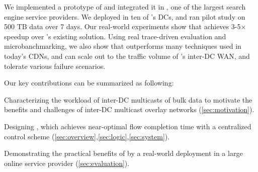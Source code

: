 We implemented a prototype of \name and integrated it in
\company,
one of the largest search engine service
providers. We deployed \name in ten of \company's DCs, and
ran pilot study on 500 TB data over 7 days. Our
real-world experiments show that \name achieves 3-5$\times$
speedup over \company's existing solution.
Using real trace-driven evaluation and microbanchmarking,
we also show that \name outperforms many techniques used in
today's CDNs, and \name can scale out to the traffic volume
of \company's inter-DC WAN, and tolerate various failure
scenarios.


Our key contributions can be summarized as following:
\begin{packeditemize}
\item Characterizing the workload of inter-DC multicasts of bulk data
to motivate the benefits and challenges of inter-DC multicast overlay
networks (\Section\ref{sec:motivation}).
\item Designing \name, which achieves near-optimal flow completion
time with a centralized control scheme (\Section\ref{sec:overview},\ref{sec:logic},\ref{sec:system}).
\item Demonstrating the practical benefits of \name by a real-world
 deployment in a large online service provider (\Section\ref{sec:evaluation}).
\end{packeditemize}
